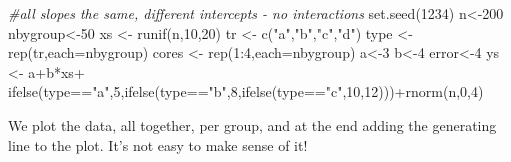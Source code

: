 \documentclass[
]{book}
\newenvironment{Shaded}{\begin{snugshade}}{\end{snugshade}}
\newcommand{\AttributeTok}[1]{\textcolor[rgb]{0.77,0.63,0.00}{#1}}
\newcommand{\CommentTok}[1]{\textcolor[rgb]{0.56,0.35,0.01}{\textit{#1}}}
\newcommand{\DecValTok}[1]{\textcolor[rgb]{0.00,0.00,0.81}{#1}}
\newcommand{\FunctionTok}[1]{\textcolor[rgb]{0.00,0.00,0.00}{#1}}
\newcommand{\NormalTok}[1]{#1}
\newcommand{\OtherTok}[1]{\textcolor[rgb]{0.56,0.35,0.01}{#1}}
\newcommand{\SpecialCharTok}[1]{\textcolor[rgb]{0.00,0.00,0.00}{#1}}
\newcommand{\StringTok}[1]{\textcolor[rgb]{0.31,0.60,0.02}{#1}}
\begin{document}
\begin{Shaded}
\begin{Highlighting}[]
\CommentTok{\#all slopes the same, different intercepts {-} no interactions}
\FunctionTok{set.seed}\NormalTok{(}\DecValTok{1234}\NormalTok{)}
\NormalTok{n}\OtherTok{\textless{}{-}}\DecValTok{200}
\NormalTok{nbygroup}\OtherTok{\textless{}{-}}\DecValTok{50}
\NormalTok{xs }\OtherTok{\textless{}{-}} \FunctionTok{runif}\NormalTok{(n,}\DecValTok{10}\NormalTok{,}\DecValTok{20}\NormalTok{)}
\NormalTok{tr }\OtherTok{\textless{}{-}} \FunctionTok{c}\NormalTok{(}\StringTok{"a"}\NormalTok{,}\StringTok{"b"}\NormalTok{,}\StringTok{"c"}\NormalTok{,}\StringTok{"d"}\NormalTok{)}
\NormalTok{type }\OtherTok{\textless{}{-}} \FunctionTok{rep}\NormalTok{(tr,}\AttributeTok{each=}\NormalTok{nbygroup)}
\NormalTok{cores }\OtherTok{\textless{}{-}} \FunctionTok{rep}\NormalTok{(}\DecValTok{1}\SpecialCharTok{:}\DecValTok{4}\NormalTok{,}\AttributeTok{each=}\NormalTok{nbygroup)}
\NormalTok{a}\OtherTok{\textless{}{-}}\DecValTok{3}
\NormalTok{b}\OtherTok{\textless{}{-}}\DecValTok{4}
\NormalTok{error}\OtherTok{\textless{}{-}}\DecValTok{4}
\NormalTok{ys }\OtherTok{\textless{}{-}}\NormalTok{ a}\SpecialCharTok{+}\NormalTok{b}\SpecialCharTok{*}\NormalTok{xs}\SpecialCharTok{+}
\FunctionTok{ifelse}\NormalTok{(type}\SpecialCharTok{==}\StringTok{"a"}\NormalTok{,}\DecValTok{5}\NormalTok{,}\FunctionTok{ifelse}\NormalTok{(type}\SpecialCharTok{==}\StringTok{"b"}\NormalTok{,}\DecValTok{8}\NormalTok{,}\FunctionTok{ifelse}\NormalTok{(type}\SpecialCharTok{==}\StringTok{"c"}\NormalTok{,}\DecValTok{10}\NormalTok{,}\DecValTok{12}\NormalTok{)))}\SpecialCharTok{+}\FunctionTok{rnorm}\NormalTok{(n,}\DecValTok{0}\NormalTok{,}\DecValTok{4}\NormalTok{)}
\end{Highlighting}
\end{Shaded}

We plot the data, all together, per group, and at the end adding the generating line to the plot. It's not easy to make sense of it!
\end{document}
